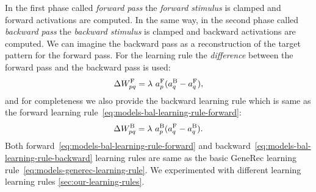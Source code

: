 In the first phase called \emph{forward pass} the \emph{forward stimulus} is clamped and forward activations are computed. In the same way, in the second phase called \emph{backward pass} the \emph{backward stimulus} is clamped and backward activations are computed. We can imagine the backward pass as a reconstruction of the target pattern for the forward pass. For the learning rule the \emph{difference} between the forward pass and the backward pass is used: 
\begin{equation}
  \label{eq:models-bal-learning-rule-forward}
  \Delta W^{\rm F}_{pq} = \lambda \ a^{\rm F}_p(a^{\rm B}_q - a^{\rm F}_q),
\end{equation}
and for completeness we also provide the backward learning rule which is same as the forward learning rule~\ref{eq:models-bal-learning-rule-forward}: 
\begin{equation}
  \label{eq:models-bal-learning-rule-backward}
  \Delta W^{\rm B}_{pq} = \lambda \ a^{\rm B}_p(a^{\rm F}_q - a^{\rm B}_q). 
\end{equation}
Both forward~\ref{eq:models-bal-learning-rule-forward} and backward~\ref{eq:models-bal-learning-rule-backward} learning rules are same as the basic GeneRec learning rule~\ref{eq:models-generec-learning-rule}. We experimented with different learning learning rules \ref{sec:our-learning-rules}. 

 


